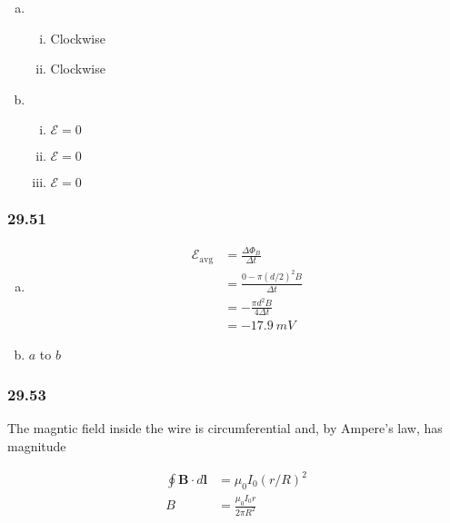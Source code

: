 \documentclass{article}
\begin{document}
\begin{enumerate}[(a)]
  \item

        \begin{enumerate}[(i)]
          \item Clockwise

          \item Clockwise
        \end{enumerate}

  \item

        \begin{enumerate}[(i)]
          \item $\mathcal{E} = 0$

          \item $\mathcal{E} = 0$

          \item $\mathcal{E} = 0$
        \end{enumerate}
\end{enumerate}

\subsubsection{29.51}

\begin{enumerate}[(a)]
  \item

        \begin{align*}
          \mathcal{E}_\text{avg} & = \frac{\Delta \Phi_B}{\Delta t}       \\
                                 & = \frac{0 - \pi (d / 2)^2 B}{\Delta t} \\
                                 & = -\frac{\pi d^2 B}{4 \Delta t}        \\
                                 & = -\qty{17.9}{mV}
        \end{align*}

  \item $a$ to $b$
\end{enumerate}

\subsubsection{29.53}

The magntic field inside the wire is circumferential and, by Ampere's law, has magnitude

\begin{align*}
  \oint \mathbf{B} \cdot d \mathbf{l} & = \mu_0 I_0 (r / R)^2           \\
  B                                   & = \frac{\mu_0 I_0 r}{2 \pi R^2}
\end{align*}
\end{document}
